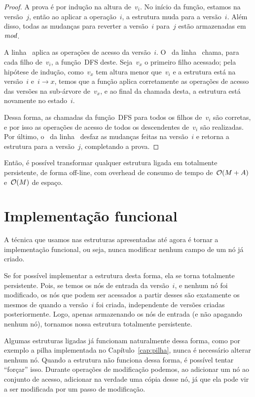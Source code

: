 \documentclass[../../main.tex]{subfiles}
\begin{document}
\begin{proof}
A prova é por indução na altura de~$v_i$. No início da função, estamos na versão~$j$, então ao aplicar a operação~$i$, a estrutura muda para a versão~$i$. Além disso, todas as mudanças para reverter a versão~$i$ para~$j$ estão armazenadas em~$\mathit{mod}$.

A linha~ aplica as operações de acesso da versão~$i$. O~ da linha~ chama, para cada filho de~$v_i$, a função~\textsc{DFS} deste. Seja~$v_x$ o primeiro filho acessado; pela hipótese de indução, como~$v_x$ tem altura menor que~$v_i$ e a estrutura está na versão~$i$ e~${i \rightarrow x}$, temos que a função aplica corretamente as operações de acesso das versões na sub-árvore de~$v_x$, e ao final da chamada desta, a estrutura está novamente no estado~$i$.

Dessa forma, as chamadas da função~\textsc{DFS} para todos os filhos de~$v_i$ são corretas, e por isso as operações de acesso de todos os descendentes de~$v_i$ são realizadas. Por último, o~ da linha~ desfaz as mudanças feitas na versão~$i$ e retorna a estrutura para a versão~$j$, completando a prova.
\end{proof}

Então, é possível transformar qualquer estrutura ligada em totalmente persistente, de forma off-line, com overhead de consumo de tempo de~$\mathcal{O}(M+A)$ e~$\mathcal{O}(M)$ de espaço.

\section{Implementação funcional}

A técnica que usamos nas estruturas apresentadas até agora é tornar a implementação funcional, ou seja, nunca modificar nenhum campo de um nó já criado.

Se for possível implementar a estrutura desta forma, ela se torna totalmente persistente. Pois, se temos os nós de entrada da versão~$i$, e nenhum nó foi modificado, os nós que podem ser acessados a partir desses são exatamente os mesmos de quando a versão~$i$ foi criada, independente de versões criadas posteriormente. Logo, apenas armazenando os nós de entrada (e não apagando nenhum nó), tornamos nossa estrutura totalmente persistente.

Algumas estruturas ligadas já funcionam naturalmente dessa forma, como por exemplo a pilha implementada no Capítulo~\ref{cap:pilha}, nunca é necessário alterar nenhum nó. Quando a estrutura não funciona dessa forma, é possível tentar ``forçar'' isso. Durante operações de modificação podemos, ao adicionar um nó ao conjunto de acesso, adicionar na verdade uma cópia desse nó, já que ela pode vir a ser modificada por um passo de modificação.
\end{document}
